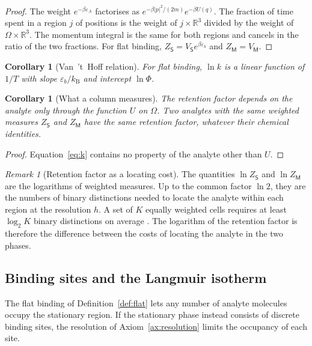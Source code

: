 \documentclass[11pt,a4paper]{article}
\newtheorem{corollary}[theorem]{Corollary}
\theoremstyle{definition}
\theoremstyle{remark}
\newtheorem{remark}[theorem]{Remark}
\newcommand{\R}{\mathbb{R}}
\newcommand{\kB}{k_{\mathrm{B}}}
\newcommand{\Mob}{\mathsf{M}}
\newcommand{\Sta}{\mathsf{S}}
\begin{document}
\begin{proof}
The weight $e^{-\beta\varepsilon_A}$ factorises as $e^{-\beta|p|^{2}/(2m)}e^{-\beta U(q)}$.
The fraction of time spent in a region $j$ of positions is the weight of $j\times\R^{3}$ divided by the weight of $\Omega\times\R^{3}$.
The momentum integral is the same for both regions and cancels in the ratio of the two fractions.
For flat binding, $Z_\Sta=V_\Sta e^{\beta\varepsilon_b}$ and $Z_\Mob=V_\Mob$.
\end{proof}

\begin{corollary}[Van~'t~Hoff relation]
\label{cor:vanthoff}
For flat binding, $\ln k$ is a linear function of $1/T$ with slope $\varepsilon_b/\kB$ and intercept $\ln\Phi$.
\end{corollary}

\begin{corollary}[What a column measures]
\label{cor:measures}
The retention factor depends on the analyte only through the function $U$ on $\Omega$.
Two analytes with the same weighted measures $Z_\Sta$ and $Z_\Mob$ have the same retention factor, whatever their chemical identities.
\end{corollary}

\begin{proof}
Equation~\eqref{eq:k} contains no property of the analyte other than $U$.
\end{proof}

\begin{remark}[Retention factor as a locating cost]
\label{rem:locating}
The quantities $\ln Z_\Sta$ and $\ln Z_\Mob$ are the logarithms of weighted measures.
Up to the common factor $\ln2$, they are the numbers of binary distinctions needed to locate the analyte within each region at the resolution $h$.
A set of $K$ equally weighted cells requires at least $\log_2K$ binary distinctions on average \citep{cover2006}.
The logarithm of the retention factor is therefore the difference between the costs of locating the analyte in the two phases.
\end{remark}

\subsection{Binding sites and the Langmuir isotherm}

The flat binding of Definition~\ref{def:flat} lets any number of analyte molecules occupy the stationary region.
If the stationary phase instead consists of discrete binding sites, the resolution of Axiom~\ref{ax:resolution} limits the occupancy of each site.
\end{document}
